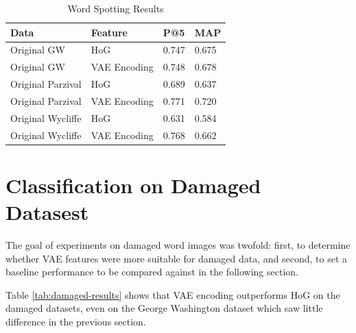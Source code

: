 \documentclass[final]{ukthesis}
\begin{document}
\begin{table}[h]
\centering
\begin{tabular}{llll}
\textbf{Data}  & \textbf{Feature} & \textbf{P@5} & \textbf{MAP} \\
\hline
Original GW    & HoG			& 0.747          & 0.675          \\
Original GW    & VAE Encoding 	& 0.748          & 0.678          \\
Original Parzival & HoG                     & 0.689          & 0.637          \\
Original Parzival & VAE Encoding 	& 0.771          & 0.720          \\
Original Wycliffe & HoG			& 0.631          & 0.584          \\
Original Wycliffe & VAE Encoding	& 0.768          & 0.662         
\end{tabular}
\caption{Word Spotting Results}
\label{tab:word-spotting}
\end{table}




%
%
\section{Classification on Damaged Datasest}
\label{sec:damaged-results}
The goal of experiments on damaged word images was twofold: first, to determine whether VAE features were more suitable for damaged data, and second, to set a baseline performance to be compared against in the following section.

Table \ref{tab:damaged-results} shows that VAE encoding outperforms HoG on the damaged datasets, even on the George Washington dataset which saw little difference in the previous section.
\end{document}
